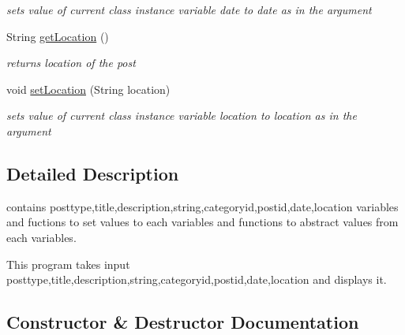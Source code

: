 \begin{DoxyCompactItemize}
\begin{DoxyCompactList}\small\item\em sets value of current class instance variable date to date as in the argument \end{DoxyCompactList}\item 
String \hyperlink{classcom_1_1example_1_1sel_1_1lostfound_1_1UserPost_ac259d30c11ccbd238a146cac9d6272e7}{get\+Location} ()\hypertarget{classcom_1_1example_1_1sel_1_1lostfound_1_1UserPost_ac259d30c11ccbd238a146cac9d6272e7}{}\label{classcom_1_1example_1_1sel_1_1lostfound_1_1UserPost_ac259d30c11ccbd238a146cac9d6272e7}

\begin{DoxyCompactList}\small\item\em returns location of the post \end{DoxyCompactList}\item 
void \hyperlink{classcom_1_1example_1_1sel_1_1lostfound_1_1UserPost_aef4e23f41ad5b75cf1633cfa0d4b7aa9}{set\+Location} (String location)\hypertarget{classcom_1_1example_1_1sel_1_1lostfound_1_1UserPost_aef4e23f41ad5b75cf1633cfa0d4b7aa9}{}\label{classcom_1_1example_1_1sel_1_1lostfound_1_1UserPost_aef4e23f41ad5b75cf1633cfa0d4b7aa9}

\begin{DoxyCompactList}\small\item\em sets value of current class instance variable location to location as in the argument \end{DoxyCompactList}\end{DoxyCompactItemize}


\subsection{Detailed Description}
contains posttype,title,description,string,categoryid,postid,date,location variables and fuctions to set values to each variables and functions to abstract values from each variables. 

This program takes input posttype,title,description,string,categoryid,postid,date,location and displays it. 

\subsection{Constructor \& Destructor Documentation}
